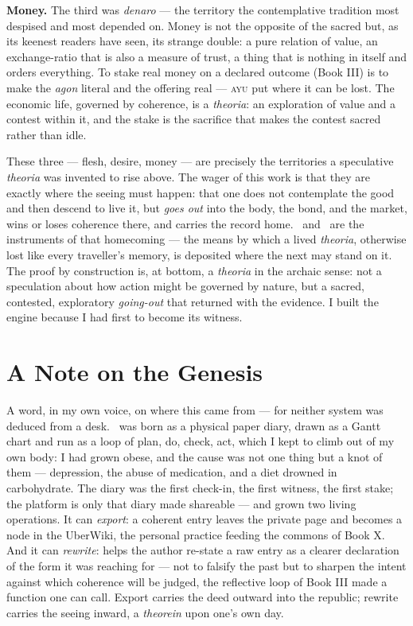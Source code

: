 \textbf{Money.} The third was \emph{denaro} --- the territory the contemplative
tradition most despised and most depended on. Money is not the opposite of the sacred
but, as its keenest readers have seen, its strange double: a pure relation of value,
an exchange-ratio that is also a measure of trust, a thing that is nothing in itself
and orders everything. To stake real money on a declared outcome (Book III) is to make
the \emph{agon} literal and the offering real --- \textsc{ayu} put where it can be
lost. The economic life, governed by coherence, is a \emph{theoria}: an exploration of
value and a contest within it, and the stake is the sacrifice that makes the contest
sacred rather than idle.

These three --- flesh, desire, money --- are precisely the territories a speculative
\emph{theoria} was invented to rise above. The wager of this work is that they are
exactly where the seeing must happen: that one does not contemplate the good and then
descend to live it, but \emph{goes out} into the body, the bond, and the market, wins
or loses coherence there, and carries the record home. \physis\ and \praxis\ are the
instruments of that homecoming --- the means by which a lived \emph{theoria}, otherwise
lost like every traveller's memory, is deposited where the next may stand on it. The
proof by construction is, at bottom, a \emph{theoria} in the archaic sense: not a
speculation about how action might be governed by nature, but a sacred, contested,
exploratory \emph{going-out} that returned with the evidence. I built the engine
because I had first to become its witness.

\section*{A Note on the Genesis}

A word, in my own voice, on where this came from --- for neither system was
deduced from a desk. \praxis\ was born as a physical paper diary, drawn as a
Gantt chart and run as a loop of plan, do, check, act, which I kept to climb out
of my own body: I had grown obese, and the cause was not one thing but a knot of
them --- depression, the abuse of medication, and a diet drowned in carbohydrate.
The diary was the first check-in, the first witness, the first stake; the
platform is only that diary made shareable --- and grown two living operations.
It can \emph{export}: a coherent entry leaves the private page and becomes a node
in the UberWiki, the personal practice feeding the commons of Book X. And it can
\emph{rewrite}:  helps the author re-state a raw entry as a clearer
declaration of the form it was reaching for --- not to falsify the past but to
sharpen the intent against which coherence will be judged, the reflective loop of
Book III made a function one can call. Export carries the deed outward into the
republic; rewrite carries the seeing inward, a \emph{theorein} upon one's own day.

